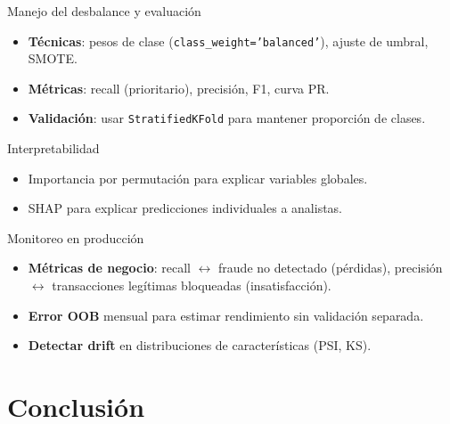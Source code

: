 \documentclass[aspectratio=169, 10pt, xcolor=table]{beamer}
\begin{document}
\begin{frame}{Manejo del desbalance y evaluación}
    \begin{itemize}
        \item \textbf{Técnicas}: pesos de clase (\texttt{class\_weight='balanced'}), ajuste de umbral, SMOTE.
        \item \textbf{Métricas}: recall (prioritario), precisión, F1, curva PR.
        \item \textbf{Validación}: usar \texttt{StratifiedKFold} para mantener proporción de clases.
    \end{itemize}
    \vspace{0.3cm}
    \begin{block}{Interpretabilidad}
        \begin{itemize}
            \item Importancia por permutación para explicar variables globales.
            \item SHAP para explicar predicciones individuales a analistas.
        \end{itemize}
    \end{block}
\end{frame}

\begin{frame}{Monitoreo en producción}
    \begin{itemize}
        \item \textbf{Métricas de negocio}: recall $\leftrightarrow$ fraude no detectado (pérdidas), precisión $\leftrightarrow$ transacciones legítimas bloqueadas (insatisfacción).
        \item \textbf{Error OOB} mensual para estimar rendimiento sin validación separada.
        \item \textbf{Detectar drift} en distribuciones de características (PSI, KS).
    \end{itemize}
\end{frame}

\section{Conclusión}
\end{document}
